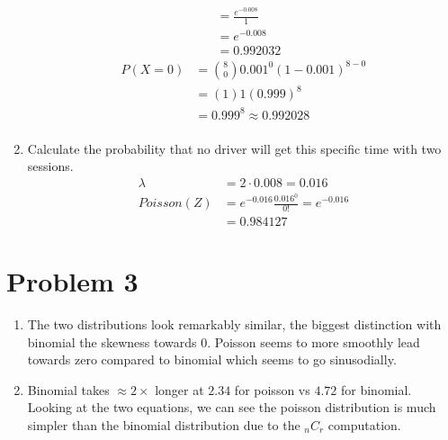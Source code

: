 \documentclass{article}
\begin{document}
\begin{enumerate}[label=\alph*)]
\begin{align*}
                       & = \frac{e^{-0.008}}{1}                \\
                       & = e^{-0.008}                          \\
                       & = 0.992032
          \end{align*}
          \begin{align*}
              P(X = 0)
               & = \binom{8}{0}0.001^0(1-0.001)^{8-0} \\
               & = (1)1(0.999)^8                      \\
               & = 0.999^8 \approx 0.992028           \\
          \end{align*}
    \item Calculate the probability that no driver will get this specific time with two sessions.
          \begin{align*}
              \lambda    & = 2\cdot0.008 = 0.016                        \\
              Poisson(Z) & = e^{-0.016} \frac{0.016^0}{0!} = e^{-0.016} \\
                         & = 0.984127
          \end{align*}
\end{enumerate}

\pagebreak

\section*{Problem 3}
\begin{enumerate}[label=\alph*)]
    \item The two distributions look remarkably similar, the biggest distinction with binomial the skewness towards 0. Poisson seems to more smoothly lead towards zero compared to binomial which seems to go sinusodially.
    \item Binomial takes \(\approx 2 \times\) longer at \(2.34\) for poisson vs \(4.72\) for binomial.
          Looking at the two equations, we can see the poisson distribution is much simpler than the binomial distribution due to the \(_{n}C_r\) computation.
\end{enumerate}

\pagebreak
\end{document}
